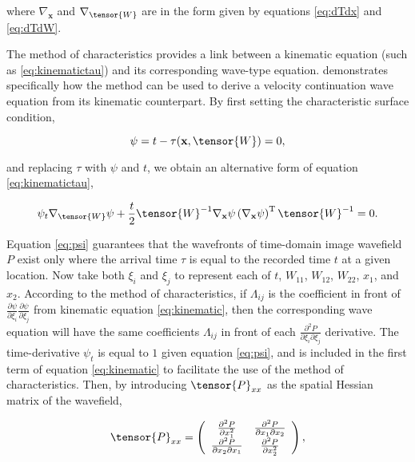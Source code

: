 \noindent where $\nabla _{\mathbf{x}}$ and $\nabla _{\tensor{W}}$ are in the form given by equations \ref{eq:dTdx} and \ref{eq:dTdW}.

The method of characteristics \cite[]{courant_hilbert89} provides a
link between a kinematic equation (such as \ref{eq:kinematictau}) and
its corresponding wave-type equation. \cite{GEO68-05-16501661}
demonstrates specifically how the method can be used to derive a
velocity continuation wave equation from its kinematic counterpart.
By first setting the characteristic surface condition,

\begin{equation}
\label{eq:psi}
\psi =t-\tau (\mathbf{x},\tensor{W})=0,
\end{equation}

\noindent and replacing $\tau $ with $\psi $ and $t$, we obtain an alternative form of equation \ref{eq:kinematictau},

\begin{equation}
\label{eq:kinematic}
\psi _t\nabla _{\tensor{W}}\psi +\frac{t}{2}\tensor{W}^{-1} \nabla _{\mathbf{x}}\psi \left( \nabla _{\mathbf{x}}\psi \right)^{\mathrm{T}}\tensor{W}^{-1}=0.
\end{equation}

\noindent Equation \ref{eq:psi} guarantees that the wavefronts of time-domain image wavefield $P $ exist only where the arrival time $\tau $ is equal to the recorded time $t$ at a given location. 
Now take both $\xi _i$ and $\xi _j$ to represent each of $t$, $W_{11}$, $W_{12}$, $W_{22}$, $x_1$, and $x_2$. 
According to the method of characteristics, if $\Lambda _{ij}$ is the coefficient in front of $\frac{\partial \psi }{\partial \xi _i}\frac{\partial \psi }{\partial \xi _j}$ from kinematic equation \ref{eq:kinematic}, then the corresponding wave equation will have the same coefficients $\Lambda _{ij}$ in front of each $\frac{\partial ^2P }{\partial \xi _i\partial \xi _j}$ derivative.  
The time-derivative $\psi _t $ is equal to $1$ given equation \ref{eq:psi}, and is included in the first term of equation \ref{eq:kinematic} to facilitate the use of the method of characteristics.
Then, by introducing $\tensor{P}_{xx}$ as the spatial Hessian matrix of the wavefield, 

\begin{equation}
\label{eq:Pxxmatrix}
\tensor{P}_{xx}=\left(
\begin{array}{cc}
 \frac{\partial ^2P }{\partial x_1^2} & \frac{\partial ^2P }{\partial x_1\partial x_2} \\
 \frac{\partial ^2P }{\partial x_2\partial x_1}  & \frac{\partial ^2P }{\partial x_2^2} 
\end{array}
\right),
\end{equation}


